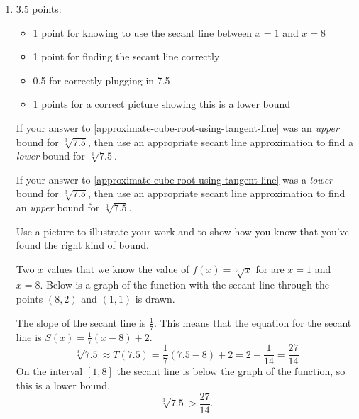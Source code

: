 \documentclass{article}
\begin{document}
\begin{enumerate}
\begin{enumerate}
  \item

    \begin{grading}
      3.5 points:
      \begin{itemize}[nosep]
      \item 1 point for knowing to use the secant line between $x = 1$
        and $x = 8$
      \item 1 point for finding the secant line correctly 
      \item 0.5 for correctly plugging in 7.5
      \item 1 points for a correct picture showing this is a lower bound
      \end{itemize}
    \end{grading}

    \begin{problem}[\vfill\newpage]
      If your answer to \ref{approximate-cube-root-using-tangent-line}
      was an \emph{upper} bound for $\sqrt[3]{7.5}$, then use an
      appropriate secant line approximation to find a \emph{lower}
      bound for $\sqrt[3]{7.5}$.

      If your answer to \ref{approximate-cube-root-using-tangent-line}
      was a \emph{lower} bound for $\sqrt[3]{7.5}$, then use an
      appropriate secant line approximation to find an \emph{upper}
      bound for $\sqrt[3]{7.5}$.

      Use a picture to illustrate your work and to show how you know
      that you've found the right kind of bound. 
    \end{problem}

    \begin{solution}  
      Two $x$ values that we know the value of $f(x) = \sqrt[3]{x}$ for are $x=1$ and $x=8$. Below is a graph of the function with the secant line through the points $(8, 2)$ and $(1, 1)$ is drawn. \begin{center} 
        \end{center} 
      The slope of the secant line is $\frac{1}{7}$. This means that the equation for the secant line is $S(x) = \frac{1}{7}(x-8) +2$. 
      $$\sqrt[3]{7.5} \approx T(7.5) = \frac{1}{7} (7.5 -8)+2=2 - \frac{1}{14} = \frac{27}{14}$$
      On the interval $[1, 8]$ the secant line is below the graph of the function, so this is a lower bound, \[\sqrt[3]{7.5}>\frac{27}{14}.\] 


\end{solution}
\end{enumerate}
\end{enumerate}
\end{document}
